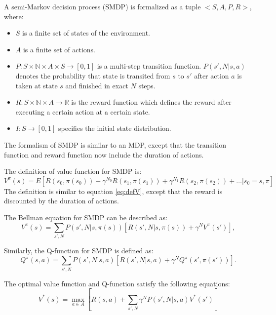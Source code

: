 \begin{definition} A semi-Markov decision process (SMDP) is formalized as a tuple $<S, A, P, R>$, where:
\begin{itemize}
    \item $S$ is a finite set of states of the environment.
    \item $A$ is a finite set of actions.
    \item $P:S \times \mathbb{N} \times A \times S \rightarrow [0, 1]$ is a multi-step transition function.
        $P(s', N | s, a)$ denotes the probability that state is transited from  $s$ to $s'$
        after action $a$ is taken at state $s$ and finished in exact $N$ steps.
    \item $R:S \times \mathbb{N} \times A \rightarrow \mathbb{R}$ is the reward function which defines the reward after executing a certain action at a certain state.
    \item $I:S \rightarrow [0, 1]$ specifies the initial state distribution.
 \end{itemize}
\end{definition}

The formalism of SMDP is similar to an MDP, except that the transition function and reward function
now include the duration of actions. 

The definition of value function for SMDP is:
\begin{equation}
    V^{\pi}(s) = E[R(s_0, \pi(s_0)) + \gamma^{N_0} R(s_1, \pi(s_1)) + \gamma^{N_1} R(s_2, \pi(s_2)) + \dots | s_0 = s, \pi]
\end{equation}
The definition is similar to equation \ref{eq:defV}, except that the reward is discounted by
the duration of actions.

The Bellman equation for SMDP can be described as:
\begin{equation}
    V^{\pi}(s) = \sum_{s', N}P(s', N|s, \pi(s))[R(s', N|s, \pi(s)) + \gamma^N V^{\pi}(s')],
    \label{eq:SMDPV}
\end{equation}

Similarly, the Q-function for SMDP is defined as:
\begin{equation}
    Q^{\pi}(s, a) = \sum_{s', N}P(s', N|s, a)[R(s', N|s, a) + \gamma^N Q^{\pi}(s', \pi(s'))].
    \label{eq:SMDPQ}
\end{equation}

The optimal value function and Q-function satisfy the following equations:
\begin{equation}
    V^*(s) = \max_{a \in A} [R(s, a) + \sum_{s', N} \gamma^N P(s', N|s, a)V^*(s')]
\end{equation}

